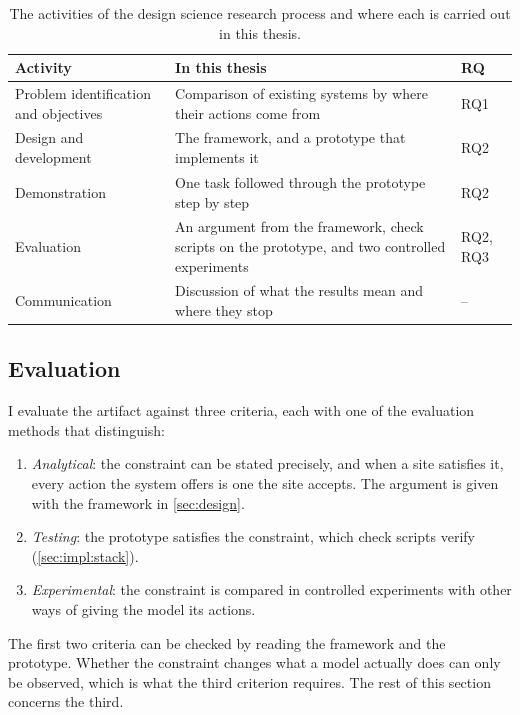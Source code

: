 \begin{table}[htbp]
\centering
\caption{The activities of the design science research process \cite{peffers2007design} and where each is carried out in this thesis.}
\label{tab:methods:rq}
\renewcommand{\arraystretch}{1.3}
\begin{tabularx}{\textwidth}{P{0.26\textwidth}LP{0.1\textwidth}}
\hline
Activity & In this thesis & RQ \\
\hline
Problem identification and objectives & Comparison of existing systems by where their actions come from & RQ1 \\
\hline
Design and development & The framework, and a prototype that implements it & RQ2 \\
\hline
Demonstration & One task followed through the prototype step by step & RQ2 \\
\hline
Evaluation & An argument from the framework, check scripts on the prototype, and two controlled experiments & RQ2, RQ3 \\
\hline
Communication & Discussion of what the results mean and where they stop & -- \\
\hline
\end{tabularx}
\end{table}

\subsection{Evaluation}\label{sec:eval:aim}

I evaluate the artifact against three criteria, each with one of the evaluation methods that \citet{hevner2004design} distinguish:
\begin{enumerate}
    \item \emph{Analytical}: the constraint can be stated precisely, and when a site satisfies it, every action the system offers is one the site accepts. The argument is given with the framework in \autoref{sec:design}.
    \item \emph{Testing}: the prototype satisfies the constraint, which check scripts verify (\autoref{sec:impl:stack}).
    \item \emph{Experimental}: the constraint is compared in controlled experiments with other ways of giving the model its actions.
\end{enumerate}

The first two criteria can be checked by reading the framework and the prototype.
Whether the constraint changes what a model actually does can only be observed, which is what the third criterion requires.
The rest of this section concerns the third.

